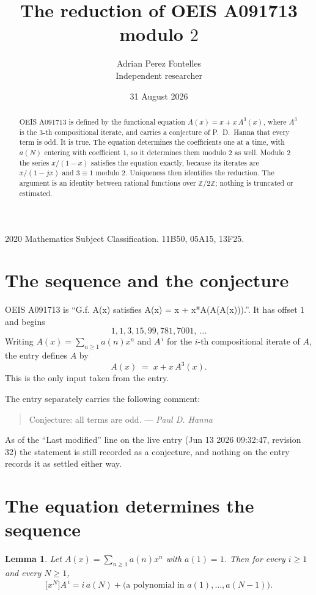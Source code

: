 \documentclass[11pt,a4paper]{article}
\title{The reduction of OEIS A091713 modulo $2$}
\author{Adrian Perez Fontelles\\ \small Independent researcher}
\date{31 August 2026}
\theoremstyle{plain}
\newtheorem{lemma}[theorem]{Lemma}
\theoremstyle{definition}
\begin{document}
\maketitle

\begin{abstract}
OEIS A091713 is defined by the functional equation $A(x)=x+x\,A^{3}(x)$, where
$A^{3}$ is the $3$-th compositional iterate, and carries a conjecture of
P.~D.~Hanna that every term is odd. It is true. The equation determines the coefficients one at a
time, with $a(N)$ entering with coefficient $1$, so it determines them modulo $2$ as
well. Modulo $2$ the series $x/(1-x)$ satisfies the equation exactly, because its
iterates are $x/(1-jx)$ and $3\equiv1$ modulo $2$. Uniqueness then identifies the
reduction. The argument is an identity between rational functions over
$\mathbb{Z}/2\mathbb{Z}$; nothing is truncated or estimated.
\end{abstract}

\noindent\small 2020 Mathematics Subject Classification. 11B50, 05A15, 13F25.\normalsize

\section{The sequence and the conjecture}

OEIS A091713 is ``G.f. A(x) satisfies A(x) = x + x*A(A(A(x))).''. It has offset $1$ and begins
\[
1, 1, 3, 15, 99, 781, 7001,\ \dots
\]
Writing $A(x)=\sum_{n\ge1}a(n)x^{n}$ and $A^{\,i}$ for the $i$-th compositional
iterate of $A$, the entry defines $A$ by
\begin{equation}\label{eq:fe}
A(x)\;=\;x+x\,A^{3}(x).
\end{equation}
This is the only input taken from the entry.

The entry separately carries the following comment:
\begin{quote}\small
Conjecture: all terms are odd. --- \emph{Paul D. Hanna}
\end{quote}
As of the ``Last modified'' line on the live entry (Jun 13 2026 09:32:47, revision 32) the statement is
still recorded as a conjecture, and nothing on the entry records it as settled either way.

\section{The equation determines the sequence}

\begin{lemma}\label{lem:jaN}
Let $A(x)=\sum_{n\ge1}a(n)x^{n}$ with $a(1)=1$. Then for every $i\ge1$ and every $N\ge1$,
\[
\bigl[x^{N}\bigr]A^{\,i}=i\,a(N)+\bigl(\text{a polynomial in }a(1),\dots,a(N-1)\bigr).
\]
\end{lemma}
\end{document}
